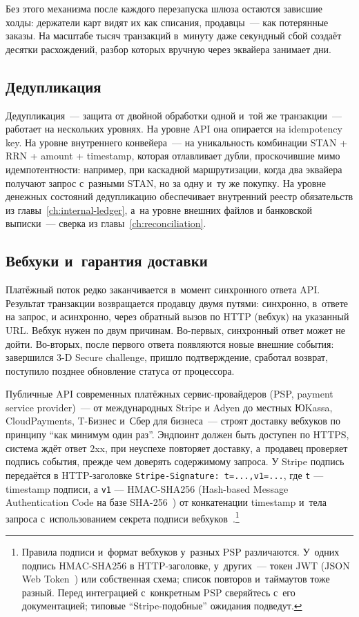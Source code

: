 Без этого механизма после каждого перезапуска шлюза остаются
зависшие холды: держатели карт видят их как
списания, продавцы~--- как потерянные заказы. На масштабе
тысяч транзакций в~минуту даже секундный сбой создаёт десятки
расхождений, разбор которых вручную через эквайера занимает дни.

\subsection*{Дедупликация}

Дедупликация~--- защита от двойной обработки одной и~той же
транзакции~--- работает на нескольких уровнях. На уровне API она опирается
на idempotency key. На уровне внутреннего конвейера~---
на уникальность комбинации STAN + RRN + amount + timestamp,
которая отлавливает дубли, проскочившие мимо идемпотентности:
например, при каскадной маршрутизации, когда два эквайера
получают запрос с~разными STAN, но за одну и~ту же покупку.
На уровне денежных состояний дедупликацию обеспечивает
внутренний реестр обязательств из главы~\ref{ch:internal-ledger},
а~на уровне внешних файлов и банковской выписки~---
сверка из главы~\ref{ch:reconciliation}.

\subsection*{Вебхуки и~гарантия доставки}

Платёжный поток редко заканчивается в~момент синхронного
ответа API. Результат транзакции возвращается продавцу
двумя путями: синхронно, в~ответе на запрос, и асинхронно,
через обратный вызов по HTTP (вебхук) на указанный URL.
Вебхук нужен по двум причинам. Во-первых, синхронный ответ может
не дойти. Во-вторых, после первого ответа появляются
новые внешние события: завершился 3-D Secure challenge,
пришло подтверждение, сработал возврат, поступило позднее
обновление статуса от процессора.

Публичные API современных платёжных сервис-провайдеров (PSP,
payment service provider)~--- от международных Stripe и
Adyen до местных ЮKassa, CloudPayments, T-Бизнес и~Сбер
для бизнеса~--- строят доставку вебхуков по принципу
\enquote{как минимум один раз}. Эндпоинт должен быть доступен
по HTTPS, система ждёт ответ 2xx, при неуспехе повторяет
доставку, а~продавец проверяет подпись события, прежде чем
доверять содержимому запроса. У Stripe подпись
передаётся в HTTP-заголовке \texttt{Stripe-Signature: t=...,v1=...}, %
где \texttt{t} --- timestamp подписи, а \texttt{v1} ---
HMAC-SHA256 (Hash-based Message Authentication Code на базе
SHA-256~\cite{rfc-2104}) от конкатенации timestamp и~тела
запроса с~использованием секрета подписи
вебхуков~\cite{stripe-webhooks}.\footnote{Правила подписи и~формат
вебхуков у~разных PSP различаются. У~одних подпись HMAC-SHA256
в HTTP-заголовке, у~других~--- токен JWT (JSON Web
Token~\cite{rfc-7519}) или собственная схема;
список повторов и~таймаутов тоже разный. Перед интеграцией
с~конкретным PSP сверяйтесь с~его документацией; типовые
\enquote{Stripe-подобные} ожидания подведут.}


